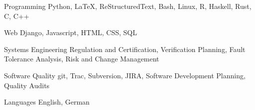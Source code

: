 


\begin{cvskills}


\cvskill
{Programming} %
{Python, \LaTeX, ReStructuredText, Bash, Linux, R, Haskell, Rust, C, C++} %


\cvskill
{Web} %
{Django, Javascript, HTML, CSS, SQL} %


\cvskill
{Systems Engineering}
{Regulation and Certification, Verification Planning, Fault Tolerance
 Analysis, Risk and Change Management}

\cvskill
{Software Quality}
{git, Trac, Subversion, JIRA, Software Development Planning, Quality Audits}


\cvskill
{Languages} %
{English, German} %


\end{cvskills}